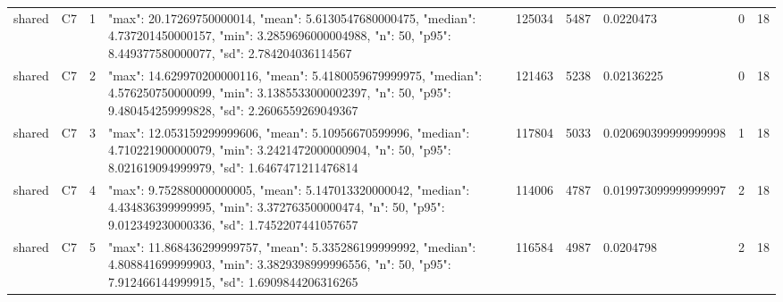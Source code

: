 \begin{tabular}{lllllllll}
shared & C7 & 1 & {"max": 20.17269750000014, "mean": 5.6130547680000475, "median": 4.737201450000157, "min": 3.2859696000004988, "n": 50, "p95": 8.449377580000077, "sd": 2.784204036114567} & 125034 & 5487 & 0.0220473 & 0 & 18 \\
shared & C7 & 2 & {"max": 14.629970200000116, "mean": 5.4180059679999975, "median": 4.576250750000099, "min": 3.1385533000002397, "n": 50, "p95": 9.480454259999828, "sd": 2.2606559269049367} & 121463 & 5238 & 0.02136225 & 0 & 18 \\
shared & C7 & 3 & {"max": 12.053159299999606, "mean": 5.10956670599996, "median": 4.710221900000079, "min": 3.2421472000000904, "n": 50, "p95": 8.021619094999979, "sd": 1.6467471211476814} & 117804 & 5033 & 0.020690399999999998 & 1 & 18 \\
shared & C7 & 4 & {"max": 9.752880000000005, "mean": 5.147013320000042, "median": 4.434836399999995, "min": 3.372763500000474, "n": 50, "p95": 9.012349230000336, "sd": 1.7452207441057657} & 114006 & 4787 & 0.019973099999999997 & 2 & 18 \\
shared & C7 & 5 & {"max": 11.868436299999757, "mean": 5.335286199999992, "median": 4.808841699999903, "min": 3.3829398999996556, "n": 50, "p95": 7.912466144999915, "sd": 1.6909844206316265} & 116584 & 4987 & 0.0204798 & 2 & 18 \\
\end{tabular}